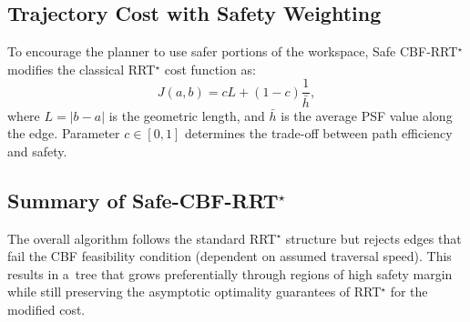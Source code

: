 \documentclass{svproc}
\begin{document}
\subsection{Trajectory Cost with Safety Weighting}
To encourage the planner to use safer portions of the workspace, Safe
CBF-RRT$^\star$ modifies the classical RRT$^\star$ cost function as:
\begin{equation}
J(a,b)=cL + (1-c)\frac{1}{\bar{h}},
\end{equation}
where $L=|b-a|$ is the geometric length, and $\bar{h}$ is the average PSF value along the edge.
Parameter $c\in[0,1]$ determines the trade-off between path efficiency and safety.

\subsection{Summary of Safe-CBF-RRT$^\star$}
The overall algorithm follows the standard RRT$^\star$ structure
but rejects edges that fail the CBF feasibility condition
(dependent on assumed traversal speed).
This results in a~tree that grows preferentially through regions
of high safety margin while still preserving the asymptotic optimality
guarantees of RRT$^\star$ for the modified cost.

\end{document}
